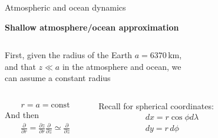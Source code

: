 \documentclass[aspectratio=169,xcolor=dvipsnames]{beamer}
\begin{document}
\begin{frame}[t]{Atmospheric and ocean dynamics}

\vspace{-1.0em}

\begin{center}
\textbf{{\large
Shallow atmosphere/ocean approximation
}}
\end{center}

\begin{columns}
    \begin{column}[t]{0.6\textwidth}

        First, given the radius of the Earth $a=6370$\,km, \\and that $z \ll a$ in the atmosphere and ocean, we \\can assume a constant radius
        \begin{columns}
            \begin{column}{0.6\textwidth}
                \begin{align*}
                    r=a=\text{const}
                \end{align*}
                And then
                \begin{align*}
                    \frac{\partial}{\partial r} = \frac{\partial z}{\partial r}\frac{\partial}{\partial z} \simeq \frac{\partial}{\partial z}
                \end{align*}
            \end{column}
            \begin{column}{0.4\textwidth}
                \vspace{3em}
                \begin{block}{}
                    \small
                    Recall for spherical coordinates:
                    \begin{align*}
                    &dx = r \cos\phi d\lambda \\
                    &dy = r\, d\phi
                    \end{align*}
                \end{block}
            \end{column}
        \end{columns}
    \end{column}
    \begin{column}[t]{0.4\textwidth}
        \begin{center}

\end{center}
\end{column}
\end{columns}
\end{frame}
\end{document}
